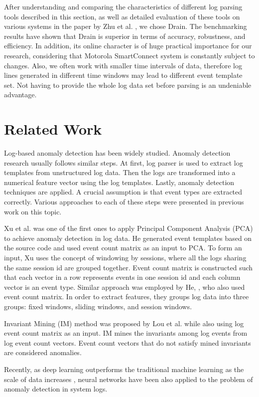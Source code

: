     After understanding and comparing the characteristics of different log parsing tools described in this section, as well as detailed evaluation of these tools on various systems in the paper by Zhu et al. \cite{zhlhxzl2018}, we chose Drain. The benchmarking results have shown that Drain is superior in terms of accuracy, robustness, and efficiency. In addition, its online character is of huge practical importance for our research, considering that Motorola SmartConnect system is constantly subject to changes. Also, we often work with smaller time intervals of data, therefore log lines generated in different time windows may lead to different event template set. Not having to provide the whole log data set before parsing is an undeniable advantage.

\section{Related Work}
Log-based anomaly detection has been widely studied. Anomaly detection research usually follows similar steps. At first, log parser is used to extract log templates from unstructured log data. Then the logs are transformed into a numerical feature vector using the log templates. Lastly, anomaly detection techniques are applied. A crucial assumption is that event types are extracted correctly. Various approaches to each of these steps were presented in previous work on this topic. 


Xu et al. \cite{xu2009} was one of the first ones to apply Principal Component Analysis (PCA) to achieve anomaly detection in log data. He generated event templates based on the source code  and used event count matrix as an input to PCA. To form an input, Xu uses the concept of windowing by sessions, where all the logs sharing the same session id are grouped together. Event count matrix is constructed such that each vector in a row represents events in one session id and each column vector is an event type. 
Similar approach was employed by He, \cite{he2016}, who also used event count matrix. In order to extract features, they groups log data into three groups: fixed windows, sliding windows, and session windows. 

Invariant Mining (IM) method was proposed by Lou et al. \cite{lou2010} while also using log event count matrix as an input. IM mines the invariants among log events from log event count vectors. Event count vectors that do not satisfy mined invariants are considered anomalies. 

Recently, as deep learning outperforms the traditional machine learning as the scale of data increases \cite{Sydney2019DeepLF}, neural networks have been also applied to the problem of anomaly detection in system logs. 


